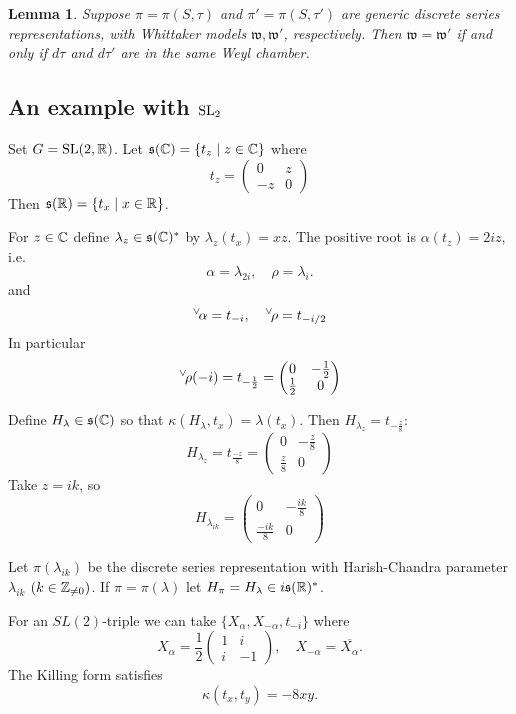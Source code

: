 \documentclass{article}
\newtheorem{lem}[thm]{Lemma}
\theoremstyle{definition}
\numberwithin{equation}{section}
\renewcommand{\-}{\hyp{}}
\newcommand{\s}{\mathfrak s}
\newcommand{\w}{\mathfrak w}
\newcommand{\SL}{\mathrm{SL}}
\newcommand{\ch}[1]{\negthinspace\negthinspace\negthinspace\phantom{a}^\vee\negthinspace #1}
\begin{document}
\begin{lem} \label{lem:g2}
    Suppose $\pi=\pi(S,\tau)$ and $\pi'=\pi(S,\tau')$ are generic discrete series representations, with Whittaker models $\w,\w'$, respectively. 
    Then $\w=\w'$ if and only if $d\tau$ and $d\tau'$ are in the same Weyl chamber.
\end{lem}
    
    
  

\subsection{An example with $\textrm{SL}_2$}

Set $G=\SL(2,\R)$. Let $\s(\C)=\{t_z\mid z\in\C\}$ where
$$
t_z=\begin{pmatrix}0&z\\-z&0
\end{pmatrix}
$$
Then $\s(\R)=\{t_x\mid x\in\R\}$.

For $z\in \mathbb{C}$ define $\lambda_z\in \s(\C)^*$ by $\lambda_z(t_x)=xz$.
The positive root is  $\alpha(t_z)=2iz$, i.e.
$$
\alpha=\lambda_{2i},\quad \rho=\lambda_i.
$$
and
$$
\ch\alpha=t_{-i}, \quad \ch\rho=t_{-i/2}
$$
In particular
$$
\ch\rho(-i)=t_{-\frac 12}=\begin{pmatrix}0&-\frac 12\\\frac 12&0
\end{pmatrix}
$$

Define $H_{\lambda}\in \s(\C)$ so that $\kappa(H_\lambda,t_x)=\lambda(t_x)$. Then $H_{\lambda_z}=t_{-\frac z8}$:
$$
H_{\lambda_z}=t_{\frac{-z}8}=
\begin{pmatrix}0&-\frac{z}8\\\frac{z}8&0
\end{pmatrix}
$$
Take $z=ik$, so
$$
H_{\lambda_{ik}}=
\begin{pmatrix}0&-\frac{ik}8\\\frac{-ik}8&0
\end{pmatrix}
$$

Let $\pi(\lambda_{ik})$ be the discrete series representation with Harish-Chandra parameter $\lambda_{ik}$ $(k\in \mathbb{Z}_{\ne 0})$.
If $\pi=\pi(\lambda)$ let $H_\pi=H_\lambda\in i\s(\R)^*$.

For an $SL(2)$-triple we can take $\{X_\alpha,X_{-\alpha},t_{-i}\}$ where
$$
X_\alpha=\frac12\begin{pmatrix}1&i\\i&-1
\end{pmatrix}, \quad X_{-\alpha}=\overline{X_\alpha}.
$$
The Killing form satisfies
$$
\kappa(t_x,t_y)=-8xy.
$$
\end{document}
